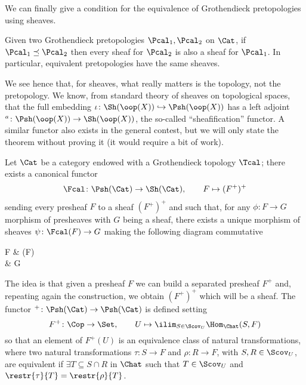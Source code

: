 \documentclass[a4paper]{article}
\begin{document}
         We can finally give a condition for the equivalence of Grothendieck pretopologies using sheaves.
         \begin{prop}
             Given two Grothendieck pretopologies $\Pcal_1, \Pcal_2$ on $\Cat$, if $\Pcal_1 \preceq \Pcal_2$ then every sheaf for $\Pcal_2$ is also a sheaf for $\Pcal_1$. In particular, equivalent pretopologies have the same sheaves.
         \end{prop}
         We see hence that, for sheaves, what really matters is the topology, not the pretopology.
         We know, from standard theory of sheaves on topological spaces, that the full embedding $\iota\colon \Sh(\oop(X)) \hookrightarrow \Psh(\oop(X))$ has a left adjoint $^a\colon \Psh(\oop(X)) \to \Sh(\oop(X))$, the so-called ``sheafification'' functor. A similar functor also exists in the general contest, but we will only state the theorem without proving it (it would require a bit of work).
         \begin{thm}
             Let $\Cat$ be a category endowed with a Grothendieck topology $\Tcal$; there exists a canonical functor 
             \begin{gather*}
                 \Fcal\colon \Psh(\Cat) \to \Sh(\Cat), \qquad F \mapsto (F^+)^+
             \end{gather*}
             sending every presheaf $F$ to a sheaf $(F^+)^+$ and such that, for any $\phi\colon F \to G$ morphism of presheaves with $G$ being a sheaf, there exists a unique morphism of sheaves $\psi\colon \Fcal(F) \to G$ making the following diagram commutative 
             \begin{diag}
                 F \arrow[r, "\Fcal_F"] \arrow[dr, "\phi"] & \Fcal(F) \\
                 & G
             \end{diag}
         \end{thm}
         The idea is that given a presheaf $F$ we can build a separated presheaf $F^+$ and, repeating again the construction, we obtain $(F^+)^+$ which will be a sheaf. The functor $^+\colon \Psh(\Cat) \to \Psh(\Cat)$ is defined setting \[F^+\colon \Cop \to \Set, \qquad U \mapsto \ilim_{S \in \Scov_U} \Hom_{\Chat}(S, F) \] so that an element of $F^+(U)$ is an equivalence class of natural transformations, where two natural transformations $\tau\colon S \to F$ and $\rho\colon R \to F$, with $S, R \in \Scov_U$, are equivalent if $\exists T \subseteq S \cap R$ in $\Chat$ such that $T \in \Scov_U$ and $\restr{\tau}{T} = \restr{\rho}{T}$. 
\end{document}
